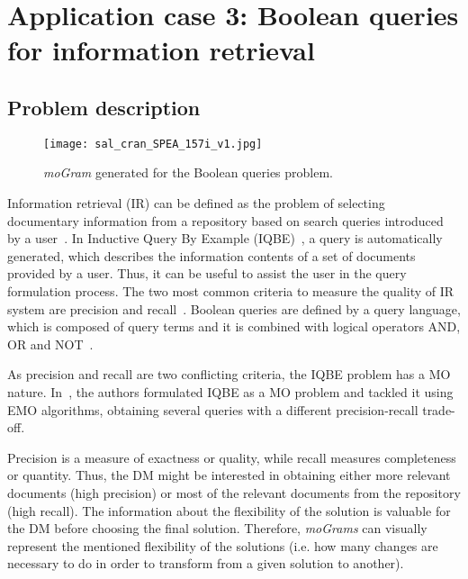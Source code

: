 \documentclass[journal]{IEEEtran}
\begin{document}
\section{Application case 3: Boolean queries for information retrieval}
\label{sec:appcase3}


\subsection{Problem description}


\begin{figure*}[htb!]
 \centering
\texttt{[image: sal\_cran\_SPEA\_157i\_v1.jpg]}
\caption{\emph{moGram} generated for the Boolean queries problem.}
\label{fig:booleanQueries}
\end{figure*}

Information retrieval (IR) can be defined as the problem of selecting documentary information from a repository based on search queries introduced by a  user~\cite{Salton86,Baeza-Yates99}.
In Inductive Query By Example (IQBE)~\cite{Chen98}, a query is automatically generated, which describes the information contents of a set of documents provided by a user. Thus, it can be useful to assist the user in the query formulation process. The two most common criteria to measure the quality of IR system are precision and recall~\cite{Rijsbergen79}.
Boolean queries are defined by a query language, which is composed of query terms and it is combined with logical operators AND, OR and NOT~\cite{Rijsbergen79}.

As precision and recall are two conflicting criteria, the IQBE problem has a MO nature. In~\cite{Cordon2006,Herrera09a,Herrera09b}, the authors formulated IQBE as a MO problem and tackled it using EMO algorithms, obtaining several queries with a different precision-recall trade-off.

Precision is a measure of exactness or quality, while recall measures completeness or quantity. Thus, the DM might be interested in obtaining either more relevant documents (high precision) or most of the relevant documents from the repository (high recall). The information about the flexibility of the solution is valuable for the DM before choosing the final solution. Therefore, \emph{moGrams} can visually represent the mentioned flexibility of the solutions (i.e. how many changes are necessary to do in order to transform from a given solution to another).
\end{document}
